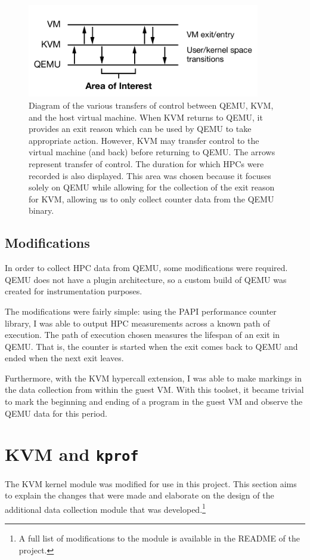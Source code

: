 \documentclass[notitlepage]{article}
\begin{document}
\begin{figure}
    \centering    
    \includegraphics[width=4in]{qemu_trap.pdf}
    \caption{Diagram of the various transfers of control between QEMU, KVM, and
        the host virtual machine. When KVM returns to QEMU, it provides an exit
        reason which can be used by QEMU to take appropriate action. However,
        KVM may transfer control to the virtual machine (and back) before
        returning to QEMU. The arrows represent transfer of control. The
        duration for which HPCs were recorded is also displayed. This area was
        chosen because it focuses solely on QEMU while allowing for the
        collection of the exit reason for KVM, allowing us to only collect
    counter data from the QEMU binary.}
\label{fig:qemutrap}
\end{figure}

\subsection{Modifications}
In order to collect HPC data from QEMU, some modifications were required. QEMU
does not have a plugin architecture, so a custom build of QEMU was created for
instrumentation purposes.

The modifications were fairly simple: using the PAPI performance counter
library, I was able to output HPC measurements across a known path of execution.
The path of execution chosen measures the lifespan of an exit in QEMU. That is,
the counter is started when the exit comes back to QEMU and ended when the next
exit leaves.

Furthermore, with the KVM hypercall extension, I was able to make markings in
the data collection from within the guest VM. With this toolset, it became
trivial to mark the beginning and ending of a program in the guest VM and
observe the QEMU data for this period.


\section{KVM and \texttt{kprof}}
\label{sec:kvm}
The KVM kernel module was modified for use in this project. This section aims to
explain the changes that were made and elaborate on the design of the additional
data collection module that was developed.\footnote{A full list of modifications
to the module is available in the README of the project.}
\end{document}
